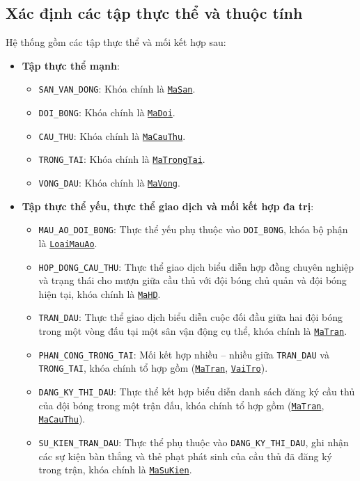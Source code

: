 \subsection{Xác định các tập thực thể và thuộc tính}
Hệ thống gồm các tập thực thể và mối kết hợp sau:
\begin{itemize}
    \item \textbf{Tập thực thể mạnh}:
    \begin{itemize}
        \item \texttt{SAN\_VAN\_DONG}: Khóa chính là \underline{\texttt{MaSan}}.
        \item \texttt{DOI\_BONG}: Khóa chính là \underline{\texttt{MaDoi}}.
        \item \texttt{CAU\_THU}: Khóa chính là \underline{\texttt{MaCauThu}}.
        \item \texttt{TRONG\_TAI}: Khóa chính là \underline{\texttt{MaTrongTai}}.
        \item \texttt{VONG\_DAU}: Khóa chính là \underline{\texttt{MaVong}}.
    \end{itemize}
    \item \textbf{Tập thực thể yếu, thực thể giao dịch và mối kết hợp đa trị}:
    \begin{itemize}
        \item \texttt{MAU\_AO\_DOI\_BONG}: Thực thể yếu phụ thuộc vào \texttt{DOI\_BONG}, khóa bộ phận là \underline{\texttt{LoaiMauAo}}.
        \item \texttt{HOP\_DONG\_CAU\_THU}: Thực thể giao dịch biểu diễn hợp đồng chuyên nghiệp và trạng thái cho mượn giữa cầu thủ với đội bóng chủ quản và đội bóng hiện tại, khóa chính là \underline{\texttt{MaHD}}.
        \item \texttt{TRAN\_DAU}: Thực thể giao dịch biểu diễn cuộc đối đầu giữa hai đội bóng trong một vòng đấu tại một sân vận động cụ thể, khóa chính là \underline{\texttt{MaTran}}.
        \item \texttt{PHAN\_CONG\_TRONG\_TAI}: Mối kết hợp nhiều -- nhiều giữa \texttt{TRAN\_DAU} và \texttt{TRONG\_TAI}, khóa chính tổ hợp gồm (\underline{\texttt{MaTran}}, \underline{\texttt{VaiTro}}).
        \item \texttt{DANG\_KY\_THI\_DAU}: Thực thể kết hợp biểu diễn danh sách đăng ký cầu thủ của đội bóng trong một trận đấu, khóa chính tổ hợp gồm (\underline{\texttt{MaTran}}, \underline{\texttt{MaCauThu}}).
        \item \texttt{SU\_KIEN\_TRAN\_DAU}: Thực thể phụ thuộc vào \texttt{DANG\_KY\_THI\_DAU}, ghi nhận các sự kiện bàn thắng và thẻ phạt phát sinh của cầu thủ đã đăng ký trong trận, khóa chính là \underline{\texttt{MaSuKien}}.
    \end{itemize}
\end{itemize}

